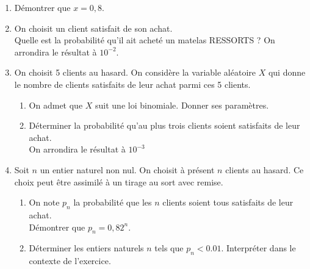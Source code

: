 \documentclass[11pt,fleqn, openany]{book} %
\begin{document}
\begin{exercise}[topic=prob13, subtitle={(Réunion 2023)}]
\begin{enumerate}
\item Démontrer que $x = 0,8$.
\item On choisit un client satisfait de son achat. \\ Quelle est la probabilité qu'il ait acheté un matelas RESSORTS ? On arrondira le résultat à $10^{-2}$.

\item On choisit 5 clients au hasard.
On considère la variable aléatoire $X$ qui donne le nombre de clients satisfaits de leur achat
parmi ces 5 clients.
\begin{enumerate}
\item On admet que $X$ suit une loi binomiale. Donner ses paramètres.
\item Déterminer la probabilité qu'au plus trois clients soient satisfaits de leur achat. \\ On arrondira le résultat à $10^{-3}$
\end{enumerate}
\item Soit $n$ un entier naturel non nul. On choisit à présent $n$ clients au hasard. Ce choix peut être assimilé à un tirage au sort avec
remise.
\begin{enumerate}
\item On note $p_n$ la probabilité que les $n$ clients soient tous satisfaits de leur achat. \\Démontrer que $p_n = 0,82^n$.
\item Déterminer les entiers naturels $n$ tels que $p_n<0.01$. Interpréter dans le contexte de l'exercice.
\end{enumerate}
\end{enumerate}
\end{exercise}
\end{document}
